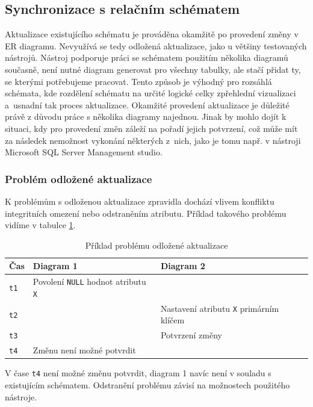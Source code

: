 \documentclass[czech,bachelor,public,dept460,male,oneside]{diploma}
\begin{document}
	\subsection{Synchronizace s relačním schématem}
	Aktualizace existujícího schématu je prováděna okamžitě po provedení změny v ER diagramu. Nevyužívá se tedy odložená aktualizace, jako u většiny testovaných nástrojů. Nástroj podporuje práci se schématem použitím několika diagramů současně, není nutné diagram generovat pro všechny tabulky, ale stačí přidat ty, se kterými potřebujeme pracovat. Tento způsob je výhodný pro rozsáhlá schémata, kde rozdělení schématu na určité logické celky zpřehlední vizualizaci a~usnadní tak proces aktualizace. Okamžité provedení aktualizace je důležité právě z důvodu práce s několika diagramy najednou. Jinak by mohlo dojít k situaci, kdy pro provedení změn záleží na pořadí jejich potvrzení, což může mít za následek nemožnost vykonání některých z~nich, jako je tomu např. v nástroji Microsoft SQL Server Management studio. 
	
		\subsubsection{Problém odložené aktualizace}
		K problémům s odloženou aktualizace zpravidla dochází vlivem konfliktu integritních omezení nebo odstraněním atributu. Příklad takového problému vidíme v tabulce \ref{tab:lateUpdateIssue}.
				
		\begin{table}[!h]
			\centering
			\caption{Příklad problému odložené aktualizace}
			\label{tab:lateUpdateIssue}
			\begin{tabular}{l l l}
				\toprule
				Čas & Diagram 1 & Diagram 2 \\
				\midrule
				\texttt{t1} & Povolení \texttt{NULL} hodnot atributu \texttt{X} & \\
				\texttt{t2} & & Nastavení atributu \texttt{X} primárním klíčem \\
				\texttt{t3} & & Potvrzení změny \\
				\texttt{t4} & Změnu není možné potvrdit & \\
				\midrule
			\end{tabular}
		\end{table}
		
		V čase \texttt{t4} není možné změnu potvrdit, diagram 1 navíc není v souladu s existujícím schématem. Odstranění problému závisí na možnostech použitého nástroje.
		
\end{document}
